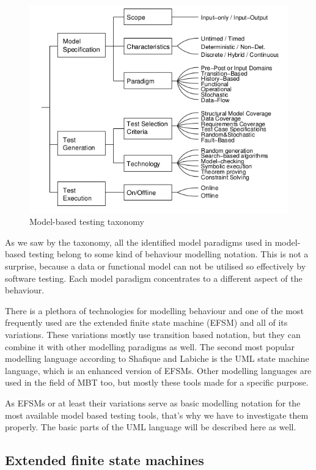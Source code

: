 \begin{figure}[htp]
\centering
\includegraphics[scale=0.5]{figures/mbt_taxonomy.png}
\caption{Model-based testing taxonomy \cite{taxonomy}}
\label{fig:mbttaxonomy}
\end{figure}

As we saw by the taxonomy, all the identified model paradigms used in model-based testing belong to some kind of behaviour modelling notation. This is not a surprise, because a data or functional model can not be utilised so effectively by software testing. Each model paradigm concentrates to a different aspect of the behaviour.

There is a plethora of technologies for modelling behaviour and one of the most frequently used are the extended finite state machine (EFSM) and all of its variations. These variations mostly use transition based notation, but they can combine it with other modelling paradigms as well. The second most popular modelling language according to Shafique and Labiche \cite{toolsreview} is the UML state machine language, which is an enhanced version of EFSMs. Other modelling languages are used in the field of MBT too, but mostly these tools made for a specific purpose.

As EFSMs or at least their variations serve as basic modelling notation for the most available model based testing tools, that's why we have to investigate them properly. The basic parts of the UML language will be described here as well.

\subsection{Extended finite state machines}
\label{sub:efsm}

